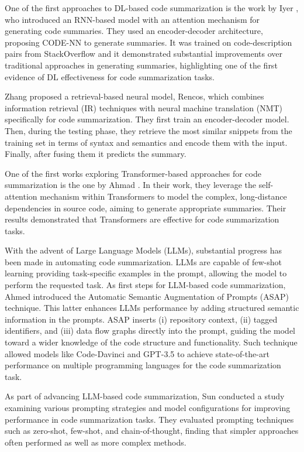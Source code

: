 One of the first approaches to DL-based code summarization is the work by Iyer \etal \cite{iyer2016summarizing}, who introduced an RNN-based model with an attention mechanism for generating code summaries. They used an encoder-decoder architecture, proposing CODE-NN to generate summaries. It was trained on code-description pairs from StackOverflow and it demonstrated substantial improvements over traditional approaches in generating summaries, highlighting one of the first evidence of DL effectiveness for code summarization tasks.

Zhang \etal \cite{zhang2020retrieval} proposed a retrieval-based neural model, Rencos, which combines information retrieval (IR) techniques with neural machine translation (NMT) specifically for code summarization. They first train an encoder-decoder model. Then, during the testing phase, they retrieve the most similar snippets from the training set in terms of syntax and semantics and encode them with the input. Finally, after fusing them it predicts the summary.

One of the first works exploring Transformer-based approaches for code summarization is the one by Ahmad \etal \cite{ahmad2020transformer}. In their work, they leverage the self-attention mechanism within Transformers to model the complex, long-distance dependencies in source code, aiming to generate appropriate summaries. Their results demonstrated that Transformers are effective for code summarization tasks.

With the advent of Large Language Models (LLMs), substantial progress has been made in automating code summarization. LLMs are capable of few-shot learning \ie providing task-specific examples in the prompt, allowing the model to perform the requested task.
As first steps for LLM-based code summarization, Ahmed \etal \cite{ahmed2024automatic} introduced the Automatic Semantic Augmentation of Prompts (ASAP) technique. This latter enhances LLMs performance by adding structured semantic information in the prompts. ASAP inserts (i) repository context, (ii) tagged identifiers, and (iii) data flow graphs directly into the prompt, guiding the model toward a wider knowledge of the code structure and functionality. Such technique allowed models like Code-Davinci and GPT-3.5 to achieve state-of-the-art performance on multiple programming languages for the code summarization task.

As part of advancing LLM-based code summarization, Sun \etal \cite{sun2024source} conducted a study examining various prompting strategies and model configurations for improving performance in code summarization tasks. They evaluated prompting techniques such as zero-shot, few-shot, and chain-of-thought, finding that simpler approaches often performed as well as more complex methods.

